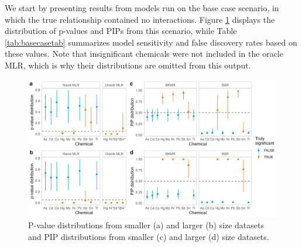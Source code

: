 \documentclass[12pt, twoside]{amherstthesis}
\begin{document}
We start by presenting results from models run on the base case scenario, in which the true relationship contained no interactions. Figure \ref{fig:basecasesig} displays the distribution of p-values and PIPs from this scenario, while Table \ref{tab:basecasetab} summarizes model sensitivity and false discovery rates based on these values. Note that insignificant chemicals were not included in the oracle MLR, which is why their distributions are omitted from this output.
\begin{figure}

{\centering \includegraphics[width=1\linewidth]{figures/ch4_basecasesig} 

}

\caption{P-value distributions from smaller (a) and larger (b) size datasets and PIP distributions from smaller (c) and larger (d) size datasets.}\label{fig:basecasesig}
\end{figure}
\end{document}
